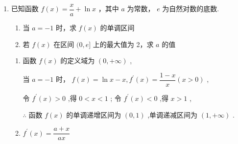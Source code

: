 \begin{enumerate}
\begin{enumerate}
\begin{jieda}
            因为 $\dfrac{1}{3}{m}^{3} - m \geq   - \dfrac{2}{3}$ ,可得 ${m}^{3} - {3m} + 2 \geq  0$ ,即 ${\left( m - 1\right) }^{2}\left( {x + 2}\right)  \geq  0$ ,解得 $m \geq   - 2$，所以 $- 2 \leq  m < 1$ ，即实数 $m$ 的取值为 $\lbrack  - 2,1)$ .
        \end{jieda}
        
        \item 已知函数 $f\left( x\right)  = \dfrac{x}{a} + \ln x$ ，其中 $a$ 为常数， ${e}$ 为自然对数的底数.
        \begin{enumerate}
            \item 当 $a =  - 1$ 时，求 $f\left( x\right)$ 的单调区间
            \item 若 $f\left( x\right)$ 在区间 $(0,{e}\rbrack$ 上的最大值为 2，求 $a$ 的值
        \end{enumerate}

        \begin{jieda}
            \begin{enumerate}
                \item 函数 $f\left( x\right)$ 的定义域为 $\left( {0, + \infty }\right)$ ,
                
                当 $a =  - 1$ 时， $f\left( x\right)  = \ln x - x,{f}^{\prime }\left( x\right)  = \dfrac{1 - x}{x}\left( {x > 0}\right)$ ,
                
                令 ${f}^{\prime }\left( x\right)  > 0$ ,得 $0 < x < 1$ ; 令 ${f}^{\prime }\left( x\right)  < 0$ ,得 $x > 1$ ,
                
                $\therefore$ 函数 $f\left( x\right)$ 的单调递增区间为 $\left( {0,1}\right)$ ,单调递减区间为 $\left( {1, + \infty }\right)$ .
                
                \item ${f}^{\prime }\left( x\right)  = \dfrac{a + x}{ax}$

\end{enumerate}
\end{jieda}
\end{enumerate}
\end{enumerate}
